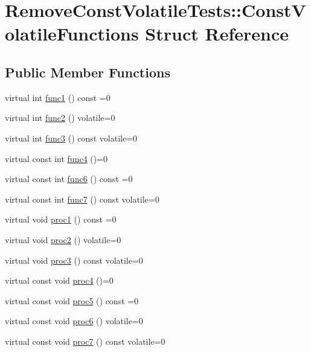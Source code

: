 \hypertarget{structRemoveConstVolatileTests_1_1ConstVolatileFunctions}{}\section{Remove\+Const\+Volatile\+Tests\+::Const\+Volatile\+Functions Struct Reference}
\label{structRemoveConstVolatileTests_1_1ConstVolatileFunctions}
\subsection*{Public Member Functions}
\begin{DoxyCompactItemize}
\item 
virtual int \mbox{\hyperlink{structRemoveConstVolatileTests_1_1ConstVolatileFunctions_afd4e0bee66da390e3ff166380e8fc407}{func1}} () const =0
\item 
virtual int \mbox{\hyperlink{structRemoveConstVolatileTests_1_1ConstVolatileFunctions_a20538aebc33f798f0c5ca1c9ea6a0d2e}{func2}} () volatile=0
\item 
virtual int \mbox{\hyperlink{structRemoveConstVolatileTests_1_1ConstVolatileFunctions_a2a9ecedb1e595a70a5e915692e170d8a}{func3}} () const volatile=0
\item 
virtual const int \mbox{\hyperlink{structRemoveConstVolatileTests_1_1ConstVolatileFunctions_aca1c05ccefb45260d5fb2fbd62f89db1}{func4}} ()=0
\item 
virtual const int \mbox{\hyperlink{structRemoveConstVolatileTests_1_1ConstVolatileFunctions_a3eec53fbdd659fb1b75f4d0b1bafcf52}{func6}} () const =0
\item 
virtual const int \mbox{\hyperlink{structRemoveConstVolatileTests_1_1ConstVolatileFunctions_a00b7f78a3ac5221e62e007f84b571e92}{func7}} () const volatile=0
\item 
virtual void \mbox{\hyperlink{structRemoveConstVolatileTests_1_1ConstVolatileFunctions_a71d20876f652fd52aa96df6d97ccaae8}{proc1}} () const =0
\item 
virtual void \mbox{\hyperlink{structRemoveConstVolatileTests_1_1ConstVolatileFunctions_a1b21b416967a60db6dded6c957a9b65e}{proc2}} () volatile=0
\item 
virtual void \mbox{\hyperlink{structRemoveConstVolatileTests_1_1ConstVolatileFunctions_a7f7ff58ffc00036e128afa768c2dcfb1}{proc3}} () const volatile=0
\item 
virtual const void \mbox{\hyperlink{structRemoveConstVolatileTests_1_1ConstVolatileFunctions_a44204c8d0ba25dad2ba88ed8d15a07a1}{proc4}} ()=0
\item 
virtual const void \mbox{\hyperlink{structRemoveConstVolatileTests_1_1ConstVolatileFunctions_ae55987996a654d6efc768da832926dc7}{proc5}} () const =0
\item 
virtual const void \mbox{\hyperlink{structRemoveConstVolatileTests_1_1ConstVolatileFunctions_a1418312af973ab6721c9454cee5cac11}{proc6}} () volatile=0
\item 
virtual const void \mbox{\hyperlink{structRemoveConstVolatileTests_1_1ConstVolatileFunctions_ae06e28f520bf5793774575208186f03c}{proc7}} () const volatile=0
\end{DoxyCompactItemize}


